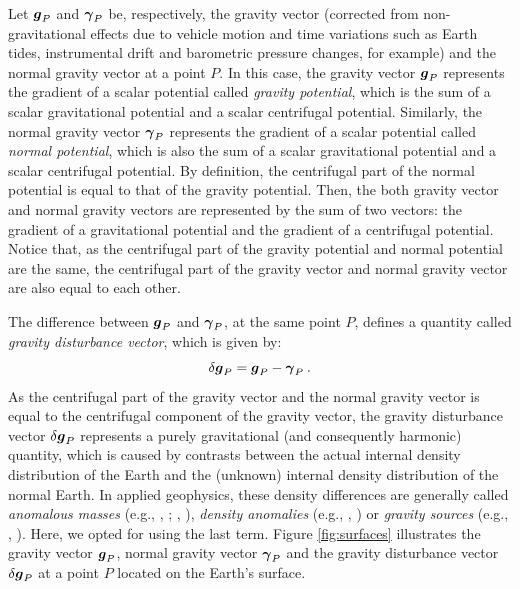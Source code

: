 \documentclass[extra]{gji}
\begin{document}
Let $\mitbf{g}_{P}$ and $\mitbf{\gamma}_{P}$ be, respectively, the 
gravity vector (corrected from non-gravitational effects due to vehicle 
motion and time variations such as Earth tides, instrumental drift and 
barometric pressure changes, for example) and the normal gravity vector 
at a point $P$. 
In this case, the gravity vector $\mitbf{g}_{P}$ represents the 
gradient of a scalar potential called \textit{gravity potential}, 
which is the sum of a scalar gravitational potential and a 
scalar centrifugal potential.
Similarly, the normal gravity vector $\mitbf{\gamma}_{P}$ represents the 
gradient of a scalar potential called \textit{normal potential}, 
which is also the sum of a scalar gravitational potential and a 
scalar centrifugal potential.
By definition, the centrifugal part of the normal potential is equal 
to that of the gravity potential.
Then, the both gravity vector and normal gravity vectors are represented 
by the sum of two vectors: the gradient of a gravitational potential and
the gradient of a centrifugal potential. Notice that, as the centrifugal 
part of the gravity potential and normal potential are the same, the
centrifugal part of the gravity vector and normal gravity vector are
also equal to each other.

The difference between $\mitbf{g}_{P}$ and $\mitbf{\gamma}_{P}$, at the same 
point $P$, defines a quantity called \textit{gravity disturbance 
vector}, which is given by:
\begin{equation}
\delta \mitbf{g}_{P} = 
\mitbf{g}_{P} - \mitbf{\gamma}_{P} \: .
\label{eq:gravity-disturbance-vector}
\end{equation}
As the centrifugal part of the gravity vector and the normal gravity vector 
is equal to the centrifugal component of the gravity vector, 
the gravity disturbance vector $\delta \mitbf{g}_{P}$ represents 
a purely gravitational (and consequently harmonic) quantity, which is 
caused by contrasts between the actual internal 
density distribution of the Earth and the (unknown) internal density 
distribution of the normal Earth.
In applied geophysics, these density differences are generally 
called \textit{anomalous masses} (e.g., \citeauthor{hammer1945}, 
\citeyear{hammer1945}; \citeauthor{lafehr1965}, \citeyear{lafehr1965}),
\textit{density anomalies} (e.g., \citeauthor{forsberg1984}, 
\citeyear{forsberg1984}) or \textit{gravity sources} (e.g., 
\citeauthor{blakely1996}, \citeyear{blakely1996}). Here, we opted for 
using the last term.
Figure \ref{fig:surfaces} illustrates the gravity vector 
$\mitbf{g}_{P}$, normal gravity vector $\mitbf{\gamma}_{P}$ and 
the gravity disturbance vector $\delta \mitbf{g}_{P}$ at a point $P$ 
located on the Earth's surface.
\end{document}
